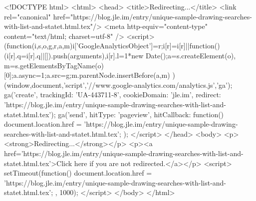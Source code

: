 <!DOCTYPE html>
<html>
<head>
<title>Redirecting...</title>
<link rel="canonical" href="https://blog.jle.im/entry/unique-sample-drawing-searches-with-list-and-statet.html.tex"/>
<meta http-equiv="content-type" content="text/html; charset=utf-8" />
<script>
(function(i,s,o,g,r,a,m){i['GoogleAnalyticsObject']=r;i[r]=i[r]||function(){
(i[r].q=i[r].q||[]).push(arguments)},i[r].l=1*new Date();a=s.createElement(o),
m=s.getElementsByTagName(o)[0];a.async=1;a.src=g;m.parentNode.insertBefore(a,m)
})(window,document,'script','//www.google-analytics.com/analytics.js','ga');
ga('create', { trackingId: 'UA-443711-8', cookieDomain: 'jle.im', redirect: 'https://blog.jle.im/entry/unique-sample-drawing-searches-with-list-and-statet.html.tex'});
ga('send', { hitType: 'pageview', hitCallback: function() { document.location.href = 'https://blog.jle.im/entry/unique-sample-drawing-searches-with-list-and-statet.html.tex'; } });
</script>
</head>
<body>
  <p><strong>Redirecting...</strong></p>
  <p><a href='https://blog.jle.im/entry/unique-sample-drawing-searches-with-list-and-statet.html.tex'>Click here if you are not redirected.</a></p>
  <script>
    setTimeout(function() { document.location.href = 'https://blog.jle.im/entry/unique-sample-drawing-searches-with-list-and-statet.html.tex'; }, 1000);
  </script>
</body>
</html>
